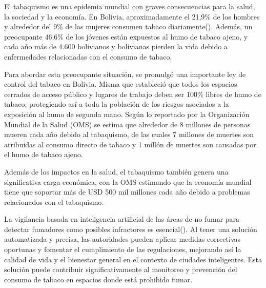 El tabaquismo es una epidemia mundial con graves consecuencias para la salud, la sociedad y la economía. En Bolivia, aproximadamente el 21,9\% de los hombres y alrededor del 9\% de las mujeres consumen tabaco diariamente(\cite{BoliviaTobaccoControlLaw}). Además, un preocupante 46,6\% de los jóvenes están expuestos al humo de tabaco ajeno, y cada año más de 4.600 bolivianos y bolivianas pierden la vida debido a enfermedades relacionadas con el consumo de tabaco.

Para abordar esta preocupante situación, se promulgó una importante ley de control del tabaco en Bolivia. Misma que estableció que todos los espacios cerrados de acceso público y lugares de trabajo deben ser 100\% libres de humo de tabaco, protegiendo así a toda la población de los riesgos asociados a la exposición al humo de segunda mano. Según lo reportado por la Organización Mundial de la Salud (OMS) se estima que alrededor de 8 millones de personas mueren cada año debido al tabaquismo, de las cuales 7 millones de muertes son atribuidas al consumo directo de tabaco y 1 millón de muertes son causadas por el humo de tabaco ajeno.

Además de los impactos en la salud, el tabaquismo también genera una significativa carga económica, con la OMS estimando que la economía mundial tiene que soportar más de USD 500 mil millones cada año debido a problemas relacionados con el tabaquismo.

La vigilancia basada en inteligencia artificial de las áreas de no fumar para detectar fumadores como posibles infractores es esencial(\cite{Khan2022b}). Al tener una solución automatizada y precisa, las autoridades pueden aplicar medidas correctivas oportunas y fomentar el cumplimiento de las regulaciones, mejorando así la calidad de vida y el bienestar general en el contexto de ciudades inteligentes.
Esta solución puede contribuir significativamente al monitoreo y prevención del consumo de tabaco en espacios donde está prohibido fumar.